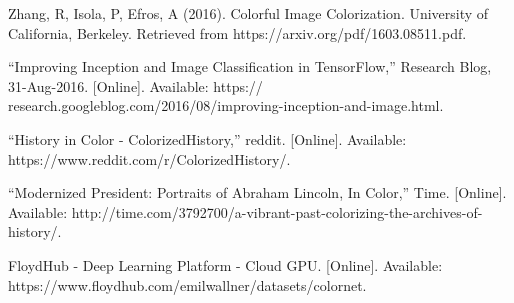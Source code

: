 \documentclass{article} %
\begin{document}
\begin{thebibliography}{8}

Zhang, R, Isola, P, Efros, A (2016). Colorful Image Colorization. University of California, Berkeley. Retrieved from https://arxiv.org/pdf/1603.08511.pdf.

“Improving Inception and Image Classification in TensorFlow,” Research Blog, 31-Aug-2016. [Online]. Available: https:// research.googleblog.com/2016/08/improving-inception-and-image.html.

“History in Color - ColorizedHistory,” reddit. [Online]. Available: https://www.reddit.com/r/ColorizedHistory/.

“Modernized President: Portraits of Abraham Lincoln, In Color,” Time. [Online]. Available: http://time.com/3792700/a-vibrant-past-colorizing-the-archives-of-history/.

FloydHub - Deep Learning Platform - Cloud GPU. [Online]. Available: https://www.floydhub.com/emilwallner/datasets/colornet.



\end{thebibliography}
\end{document}
